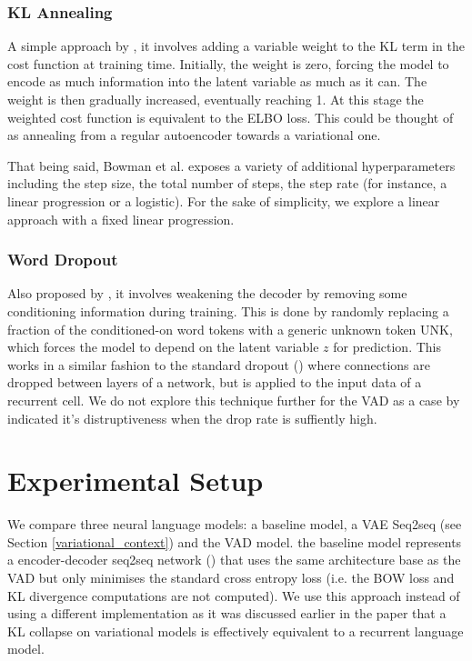 \documentclass[12pt,twoside]{report}
\begin{document}
\subsection{KL Annealing}

A simple approach by \cite{bowman_generating_2015}, it involves adding a variable weight to the KL term in the cost function at training time. Initially, the weight is zero, forcing the model to encode as much information into the latent variable as much as it can. The weight is then gradually increased, eventually reaching 1. At this stage the weighted cost function is equivalent to the ELBO loss. This could be thought of as annealing from a regular autoencoder towards a variational one.

That being said, Bowman et al. exposes a variety of additional hyperparameters including the step size, the total number of steps, the step rate (for instance, a linear progression or a logistic). For the sake of simplicity, we explore a linear approach with a fixed linear progression.

\subsection{Word Dropout}
Also proposed by \cite{bowman_generating_2015}, it involves weakening the decoder by removing some conditioning information during training. This is done by randomly replacing a fraction of the conditioned-on word tokens with a generic unknown token UNK, which forces the model to depend on the latent variable $z$ for prediction. This works in a similar fashion to the standard dropout (\cite{srivastava_dropout:_2014}) where connections are dropped between layers of a network, but is applied to the input data of a recurrent cell. We do not explore this technique further for the VAD as a case by \cite{bowman_generating_2015} indicated it's distruptiveness when the drop rate is suffiently high.

\chapter{Experimental Setup}

We compare three neural language models: a baseline model, a VAE Seq2seq (see Section \ref{variational_context}) and the VAD model. the baseline model represents a encoder-decoder seq2seq network (\cite{serban_hierarchical_2016}) that uses the same architecture base as the VAD but only minimises the standard cross entropy loss (i.e. the BOW loss and KL divergence computations are not computed). We use this approach instead of using a different implementation as it was discussed earlier in the paper that a KL collapse on variational models is effectively equivalent to a recurrent language model.
\end{document}

